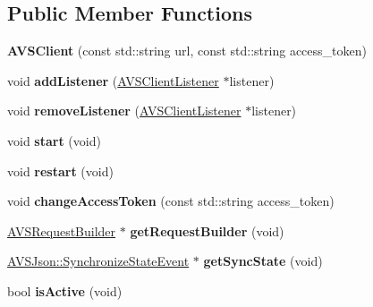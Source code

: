 \subsection*{Public Member Functions}
\begin{DoxyCompactItemize}
\item 
\mbox{\label{classAVSClient_ae0d7c3e648fc864ae436831e17f794e2}} 
{\bfseries A\+V\+S\+Client} (const std\+::string url, const std\+::string access\+\_\+token)
\item 
\mbox{\label{classAVSClient_a23465de5d4163ee26d9576e721f6f0c6}} 
void {\bfseries add\+Listener} (\hyperlink{classAVSClientListener}{A\+V\+S\+Client\+Listener} $\ast$listener)
\item 
\mbox{\label{classAVSClient_a634dd701d7f6f6e6bdb31d7f5abaa51c}} 
void {\bfseries remove\+Listener} (\hyperlink{classAVSClientListener}{A\+V\+S\+Client\+Listener} $\ast$listener)
\item 
\mbox{\label{classAVSClient_a1f9560eb150c6ef158af1541c7cde899}} 
void {\bfseries start} (void)
\item 
\mbox{\label{classAVSClient_a013525f5bcb5608feda51c45504a1c38}} 
void {\bfseries restart} (void)
\item 
\mbox{\label{classAVSClient_a3f4655c808ea71fc7d9192a277daca00}} 
void {\bfseries change\+Access\+Token} (const std\+::string access\+\_\+token)
\item 
\mbox{\label{classAVSClient_a9af7374fe03aa49a3557c3fd574a6c58}} 
\hyperlink{classAVSRequestBuilder}{A\+V\+S\+Request\+Builder} $\ast$ {\bfseries get\+Request\+Builder} (void)
\item 
\mbox{\label{classAVSClient_ac1d14f5bbf23b2b7c108887b45a7247f}} 
\hyperlink{structAVSJson_1_1SynchronizeStateEvent}{A\+V\+S\+Json\+::\+Synchronize\+State\+Event} $\ast$ {\bfseries get\+Sync\+State} (void)
\item 
\mbox{\label{classAVSClient_a7ec5d02b02e8ea15e4d79c155bed41e7}} 
bool {\bfseries is\+Active} (void)
\item 

\end{DoxyCompactItemize}
